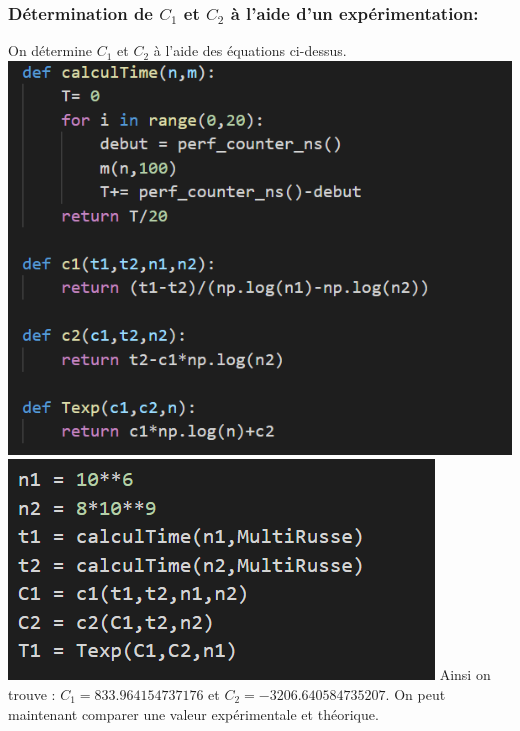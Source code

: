 \documentclass[12pt,a4paper]{report}
\begin{document}
\begin{flushleft}
\subsubsection{Détermination de $C_{1}$ et $C_{2}$ à l'aide d'un expérimentation:}
On détermine $C_{1}$ et $C_{2}$ à l'aide des équations ci-dessus.
\includegraphics[scale=0.4]{ProgC1C2}
\includegraphics[scale=0.5]{DeterC1C2}
Ainsi on trouve : $C_{1} = 833.964154737176$ et $C_{2} = -3206.640584735207 $. On peut maintenant comparer une valeur expérimentale et théorique.

\end{flushleft}
\end{document}
